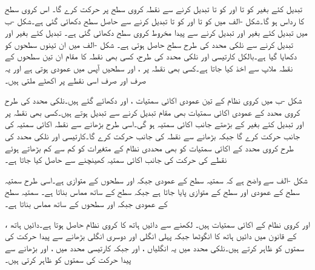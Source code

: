  تبدیل کئے بغیر  کو  تا  اور  کو  تا  تبدیل کرنے سے  نقطہ  کروی  سطح  پر حرکت کرے گا۔ اس کروی سطح کا رداس  ہو گا۔شکل -الف  میں  کو  تا  اور  کو  تا  تبدیل کرنے سے حاصل سطح  دکھائی گئی ہے۔شکل -ب میں  تبدیل کئے بغیر  اور  تبدیل کرنے سے پیدا مخروط    کروی سطح دکھائی گئی ہے۔ تبدیل کئے بغیر  اور  تبدیل کرنے سے  نلکی محدد کی طرح  سطح حاصل ہوتی ہے۔ شکل -الف میں ان تینوں سطحوں کو دکھایا گیا ہے۔بالکل کارتیسی اور نلکی محدد کی طرح، کسی بھی نقطہ  کا مقام ان تین سطحوں کے نقطہ ملاپ سے اخذ کیا جاتا ہے۔کسی بھی نقطہ  پر ،  اور  سطحیں آپس میں عمودی ہوتی ہے اور یہ صرف اور صرف اسی نقطے پر اکھٹے ملتی ہیں۔

شکل -ب میں کروی نظام کے تین عمودی اکائی سمتیات ،  اور  دکھائے گئے ہیں۔نلکی محدد کی طرح کروی محدد کے عمودی اکائی سمتیات بھی مقام تبدیل کرنے سے تبدیل ہوتے ہیں۔کسی بھی نقطہ  پر  اور  تبدیل کئے بغیر  کے بڑھتے جانب اکائی سمتیہ  ہو گی۔اسی طرح  بڑھانے سے نقطہ  اکائی سمتیہ  کی جانب حرکت کرے گا جبکہ  بڑھانے سے نقطہ  کی جانب حرکت کرے گا۔کارتیسی اور نلکی محدد کی طرح کروی محدد کے اکائی سمتیات کو بھی محددی نظام کے متغیرات کو کم سے کم بڑھاتے ہوئے  نقطے کی حرکت کی جانب اکائی سمتیہ کھینچنے سے حاصل کیا جاتا ہے۔

شکل -الف سے واضح ہے کہ  سمتیہ  سطح کے عمودی جبکہ  اور  سطحوں کے متوازی ہے۔اسی طرح  سمتیہ  سطح کے عمودی اور  سطح کے متوازی پایا جاتا ہے جبکہ  سطح کے ساتھ مماس بناتا ہے۔ سمتیہ  سطح کے عمودی جبکہ  اور  سطحوں کے ساتھ مماس بناتا ہے۔


،  اور  کروی نظام  کے اکائی سمتیات ہیں۔ لکھنے سے  دائیں ہاتھ کا کروی نظام حاصل ہوتا ہے۔دائیں ہاتھ کے قانون میں دائیں ہاتھ کا انگوٹھا   جبکہ پہلی انگلی   اور دوسری انگلی  بڑھانے سے پیدا حرکت کی سمتوں کو ظاہر کرتے ہیں۔نلکی محدد میں یہ انگلیاں ،  اور  جبکہ کارتیسی محدد میں ،  اور  بڑھانے سے پیدا حرکت کی سمتوں کو ظاہر کرتی ہیں۔

